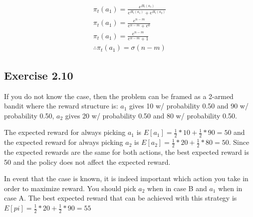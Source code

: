 \begin{gather}
  \pi_t(a_1) = \frac{e^{H_t(a_1)}}{e^{H_t(a_1)} + e^{H_t(a_2)}} \\
  \pi_t(a_1) = \frac{e^{n-m}}{e^{n-m} + e^{0}} \\
  \pi_t(a_1) = \frac{e^{n-m}}{e^{n-m} + 1} \\
  \therefore
  \pi_t(a_1) = \sigma(n-m)
\end{gather}

\subsection{Exercise 2.10}
If you do not know the case, then the problem can be framed as a 2-armed bandit where the reward structure is: $a_1$ gives 10 w/ probability 0.50 and 90 w/ probability 0.50, $a_2$ gives 20 w/ probability 0.50 and 80 w/ probability 0.50. 

The expected reward for always picking $a_1$ is $E[a_1] = \frac{1}{2} * 10 + \frac{1}{2} * 90 = 50$ and the expected reward for always picking $a_2$ is $E[a_2] = \frac{1}{2} * 20 + \frac{1}{2} * 80 = 50$. Since the expected rewards are the same for both actions, the best expected reward is 50 and the policy does not affect the expected reward.

In event that the case is known, it is indeed important which action you take in order to maximize reward. You should pick $a_2$ when in case B and $a_1$ when in case A. The best expected reward that can be achieved with this strategy is $E[pi] = \frac{1}{2} * 20 + \frac{1}{2} * 90 = 55$